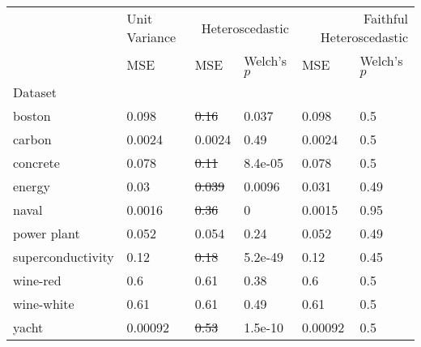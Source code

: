 \begin{tabular}{l|l|ll|ll}
\toprule
 & Unit Variance & \multicolumn{2}{r}{Heteroscedastic} & \multicolumn{2}{r}{Faithful Heteroscedastic} \\
 & MSE & MSE & Welch's $p$ & MSE & Welch's $p$ \\
Dataset &  &  &  &  &  \\
\midrule
boston & 0.098 & \sout{0.16} & 0.037 & 0.098 & 0.5 \\
carbon & 0.0024 & 0.0024 & 0.49 & 0.0024 & 0.5 \\
concrete & 0.078 & \sout{0.11} & 8.4e-05 & 0.078 & 0.5 \\
energy & 0.03 & \sout{0.039} & 0.0096 & 0.031 & 0.49 \\
naval & 0.0016 & \sout{0.36} & 0 & 0.0015 & 0.95 \\
power plant & 0.052 & 0.054 & 0.24 & 0.052 & 0.49 \\
superconductivity & 0.12 & \sout{0.18} & 5.2e-49 & 0.12 & 0.45 \\
wine-red & 0.6 & 0.61 & 0.38 & 0.6 & 0.5 \\
wine-white & 0.61 & 0.61 & 0.49 & 0.61 & 0.5 \\
yacht & 0.00092 & \sout{0.53} & 1.5e-10 & 0.00092 & 0.5 \\
\bottomrule
\end{tabular}
